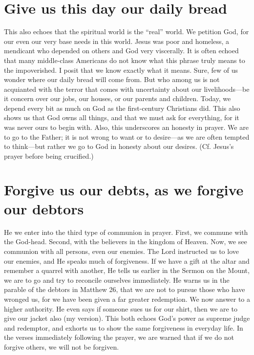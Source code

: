 \documentclass[12pt]{article}
\begin{document}
\section{Give us this day our daily bread}

This also echoes that the spiritual world is the ``real'' world.  We petition God, for our even our very base needs in this world.  Jesus was poor and homeless, a mendicant who depended on others and God very viscerally.  It is often echoed that many middle-class Americans do not know what this phrase truly means to the impoverished.  I posit that we know exactly what it means.  Sure, few of us wonder where our daily bread will come from.  But who among us is not acquianted with the terror that comes with uncertainty about our livelihoods---be it concern over our jobs, our houses, or our parents and children.  Today, we depend every bit as much on God as the first-century Christians did.  This also shows us that God owns all things, and that we must ask for everything, for it was never ours to begin with.  Also, this underscores an honesty in prayer.  We are to go to the Father; it is not wrong to want or to desire---as we are often tempted to think---but rather we go to God in honesty about our desires.  (Cf. Jesus's prayer before being crucified.)

\section{Forgive us our debts, as we forgive our debtors}

He we enter into the third type of communion in prayer.  First, we commune with the God-head.  Second, with the believers in the kingdom of Heaven.  Now, we see communion with all persons, even our enemies.  The Lord instructed us to love our enemies, and He speaks much of forgiveness.  If we have a gift at the altar and remember a quarrel with another, He tells us earlier in the Sermon on the Mount, we are to go and try to reconcile ourselves immediately.  He warns us in the parable of the debtors in Matthew 26, that we are not to pursue those who have wronged us, for we have been given a far greater redemption.  We now answer to a higher authority.  He even says if someone sues us for our shirt, then we are to give our jacket also (my version).  This both echoes God's power as supreme judge and redemptor, and exhorts us to show the same forgiveness in everyday life.  In the verses immediately following the prayer, we are warned that if we do not forgive others, we will not be forgiven.
\end{document}
